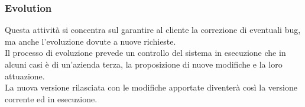 \subsubsection{Evolution}
Questa attività si concentra sul garantire al cliente la correzione di eventuali bug, ma anche l'evoluzione dovute a nuove richieste.\\
Il processo di evoluzione prevede un controllo del sistema in esecuzione che in alcuni casi è di un'azienda terza, la proposizione di nuove modifiche e la loro attuazione.\\
La nuova versione rilasciata con le modifiche apportate diventerà così la versione corrente ed in esecuzione.